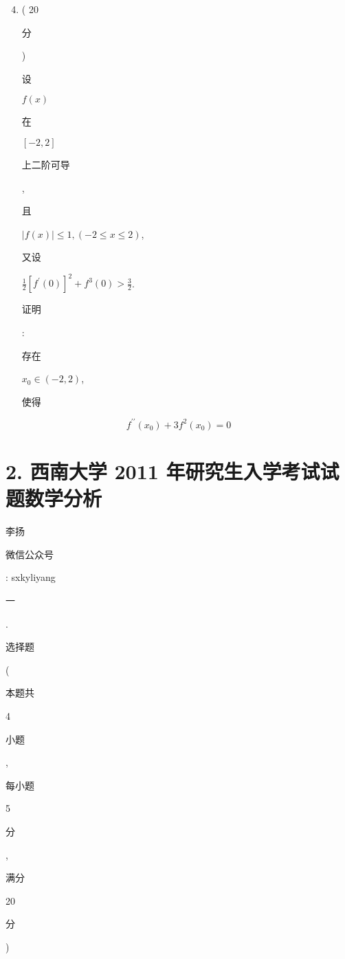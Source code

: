 \documentclass[10pt]{article}
\begin{document}
\begin{enumerate}
  \setcounter{enumi}{3}
  \item ( 20 \begin{CJK}{UTF8}{mj}分\end{CJK}) \begin{CJK}{UTF8}{mj}设\end{CJK} $f(x)$ \begin{CJK}{UTF8}{mj}在\end{CJK} $[-2,2]$ \begin{CJK}{UTF8}{mj}上二阶可导\end{CJK}, \begin{CJK}{UTF8}{mj}且\end{CJK} $|f(x)| \leqslant 1,(-2 \leqslant x \leqslant 2)$, \begin{CJK}{UTF8}{mj}又设\end{CJK} $\frac{1}{2}\left[f^{\prime}(0)\right]^{2}+f^{3}(0)>\frac{3}{2}$. \begin{CJK}{UTF8}{mj}证明\end{CJK}: \begin{CJK}{UTF8}{mj}存在\end{CJK} $x_{0} \in(-2,2)$, \begin{CJK}{UTF8}{mj}使得\end{CJK}
\end{enumerate}
$$
f^{\prime \prime}\left(x_{0}\right)+3 f^{2}\left(x_{0}\right)=0
$$

\section{2. 西南大学 2011 年研究生入学考试试题数学分析}
\begin{CJK}{UTF8}{mj}李扬\end{CJK}

\begin{CJK}{UTF8}{mj}微信公众号\end{CJK}: sxkyliyang

\begin{CJK}{UTF8}{mj}一\end{CJK}. \begin{CJK}{UTF8}{mj}选择题\end{CJK} (\begin{CJK}{UTF8}{mj}本题共\end{CJK} 4 \begin{CJK}{UTF8}{mj}小题\end{CJK}, \begin{CJK}{UTF8}{mj}每小题\end{CJK} 5 \begin{CJK}{UTF8}{mj}分\end{CJK}, \begin{CJK}{UTF8}{mj}满分\end{CJK} 20 \begin{CJK}{UTF8}{mj}分\end{CJK})
\end{document}
